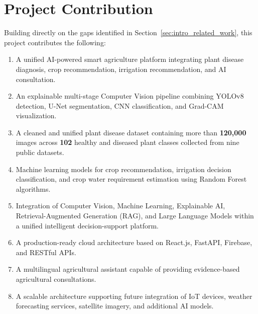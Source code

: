 \section{Project Contribution}
\label{sec:intro_contributions}

Building directly on the gaps identified in Section~\ref{sec:intro_related_work}, this project contributes the following:

\begin{enumerate}[leftmargin=*,label=\textbf{C\arabic*.}]

\item A unified AI-powered smart agriculture platform integrating plant disease diagnosis, crop recommendation, irrigation recommendation, and AI consultation.

\item An explainable multi-stage Computer Vision pipeline combining YOLOv8 detection, U-Net segmentation, CNN classification, and Grad-CAM visualization.

\item A cleaned and unified plant disease dataset containing more than \textbf{120,000} images across \textbf{102} healthy and diseased plant classes collected from nine public datasets.

\item Machine learning models for crop recommendation, irrigation decision classification, and crop water requirement estimation using Random Forest algorithms.

\item Integration of Computer Vision, Machine Learning, Explainable AI, Retrieval-Augmented Generation (RAG), and Large Language Models within a unified intelligent decision-support platform.

\item A production-ready cloud architecture based on React.js, FastAPI, Firebase, and RESTful APIs.

\item A multilingual agricultural assistant capable of providing evidence-based agricultural consultations.

\item A scalable architecture supporting future integration of IoT devices, weather forecasting services, satellite imagery, and additional AI models.

\end{enumerate}
